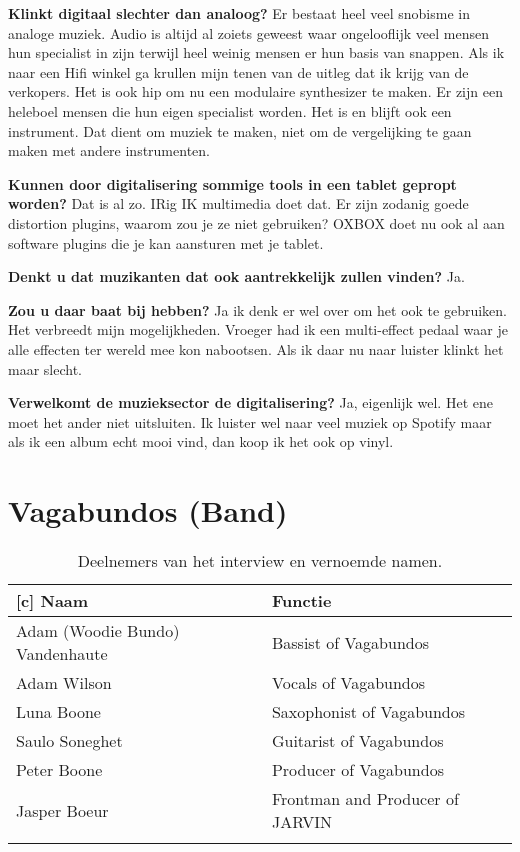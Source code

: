 \textbf{Klinkt digitaal slechter dan analoog?}\newline
Er bestaat heel veel snobisme in analoge muziek.
Audio is altijd al zoiets geweest waar ongelooflijk veel mensen hun specialist in zijn terwijl heel weinig mensen er hun basis van snappen.
Als ik naar een Hifi winkel ga krullen mijn tenen van de uitleg dat ik krijg van de verkopers.
Het is ook hip om nu een modulaire synthesizer te maken. Er zijn een heleboel mensen die hun eigen specialist worden.
Het is en blijft ook een instrument. Dat dient om muziek te maken, niet om de vergelijking te gaan maken met andere instrumenten.

\textbf{Kunnen door digitalisering sommige tools in een tablet gepropt worden?}\newline
Dat is al zo. IRig IK multimedia doet dat. Er zijn zodanig goede distortion plugins, waarom zou je ze niet gebruiken?
OXBOX doet nu ook al aan software plugins die je kan aansturen met je tablet.

\textbf{Denkt u dat muzikanten dat ook aantrekkelijk zullen vinden?}\newline
Ja.

\textbf{Zou u daar baat bij hebben?}\newline
Ja ik denk er wel over om het ook te gebruiken. Het verbreedt mijn mogelijkheden.
Vroeger had ik een multi-effect pedaal waar je alle effecten ter wereld mee kon nabootsen. Als ik daar nu naar luister klinkt het maar slecht.

\textbf{Verwelkomt de muzieksector de digitalisering?}\newline
Ja, eigenlijk wel. Het ene moet het ander niet uitsluiten. Ik luister wel naar veel muziek op Spotify maar als ik een album echt mooi vind, dan koop ik het ook op vinyl.

\section{Vagabundos (Band)}
\label{trans:vagabundos}

\begin{longtable}{l|l}[c]
\textbf{Naam} & \textbf{Functie} \\ \hline
Adam (Woodie Bundo) Vandenhaute & Bassist of Vagabundos \\
Adam Wilson & Vocals of Vagabundos \\
Luna Boone & Saxophonist of Vagabundos \\
Saulo Soneghet & Guitarist of Vagabundos \\ \hline
Peter Boone & Producer of Vagabundos \\
Jasper Boeur & Frontman and Producer of JARVIN \\
\caption{Deelnemers van het interview en vernoemde namen.}
\label{tab:vagapeeps}
\end{longtable}

